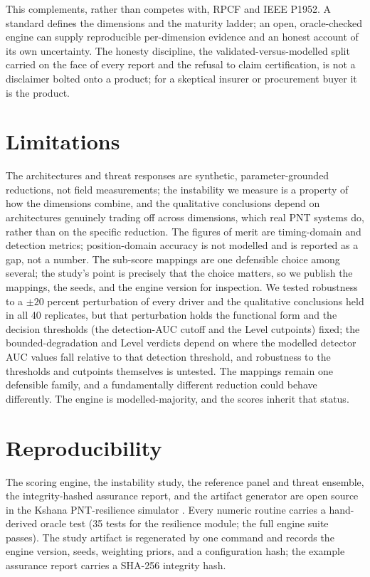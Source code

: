 \documentclass[conference]{IEEEtran}
\begin{document}
This complements, rather than competes with, RPCF and IEEE P1952. A standard defines the dimensions and the maturity ladder; an open, oracle-checked engine \cite{kshana} can supply reproducible per-dimension evidence and an honest account of its own uncertainty. The honesty discipline, the validated-versus-modelled split carried on the face of every report and the refusal to claim certification, is not a disclaimer bolted onto a product; for a skeptical insurer or procurement buyer it is the product.

\section{Limitations}
The architectures and threat responses are synthetic, parameter-grounded reductions, not field measurements; the instability we measure is a property of how the dimensions combine, and the qualitative conclusions depend on architectures genuinely trading off across dimensions, which real PNT systems do, rather than on the specific reduction. The figures of merit are timing-domain and detection metrics; position-domain accuracy is not modelled and is reported as a gap, not a number. The sub-score mappings are one defensible choice among several; the study's point is precisely that the choice matters, so we publish the mappings, the seeds, and the engine version for inspection. We tested robustness to a $\pm 20$ percent perturbation of every driver and the qualitative conclusions held in all 40 replicates, but that perturbation holds the functional form and the decision thresholds (the detection-AUC cutoff and the Level cutpoints) fixed; the bounded-degradation and Level verdicts depend on where the modelled detector AUC values fall relative to that detection threshold, and robustness to the thresholds and cutpoints themselves is untested. The mappings remain one defensible family, and a fundamentally different reduction could behave differently. The engine is modelled-majority, and the scores inherit that status.

\section{Reproducibility}
The scoring engine, the instability study, the reference panel and threat ensemble, the integrity-hashed assurance report, and the artifact generator are open source in the Kshana PNT-resilience simulator \cite{kshana}. Every numeric routine carries a hand-derived oracle test (35 tests for the resilience module; the full engine suite passes). The study artifact is regenerated by one command and records the engine version, seeds, weighting priors, and a configuration hash; the example assurance report carries a SHA-256 integrity hash.
\end{document}
